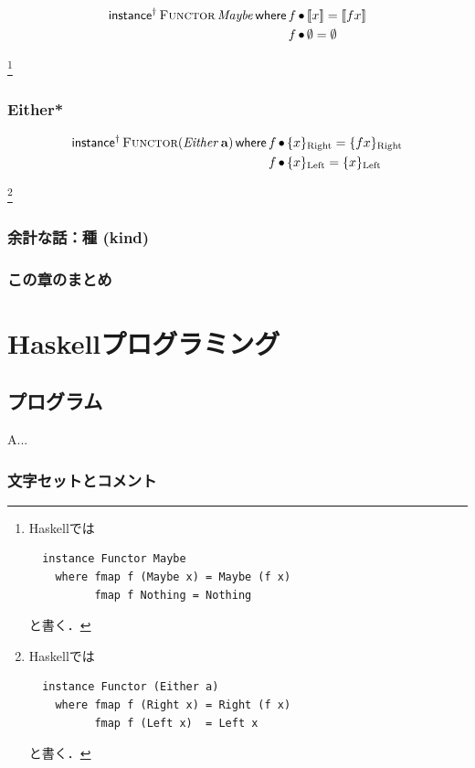 \documentclass[a4paper,twocolumn]{jsbook}
\def\[{\left[\!\left[}
\def\]{\right]\!\right]}
\newcommand{\programminglanguage}[1]{\textsf{#1}}
\newcommand{\haskell}{\programminglanguage{Haskell}}
\newenvironment{leader}{\begingroup\gt}{\endgroup}
\newcommand{\mKeyword}[1]{\mathsf{#1}} %
\newcommand{\mInstanceKeyword}{\mKeyword{instance}}
\newcommand{\mWhereKeyword}{\mKeyword{where}}
\DeclareMathOperator{\mInstanceParametric}{\mInstanceKeyword^{\dagger}}
\DeclareMathOperator{\mWhere}{\mWhereKeyword}
\newcommand{\mNothing}{\emptyset}
\DeclareMathOperator{\mLetEq}{\triangleq}
\DeclareMathOperator{\mMap}{\bullet}
\newcommand{\mSpecialSub}[1]{\text{#1}}
\newcommand{\mLeft}{\mSpecialSub{Left}}
\newcommand{\mRight}{\mSpecialSub{Right}}
\newcommand{\mType}[1]{\mathbf{#1}}
\newcommand{\mEitherLeftWith}[1]{\{#1\}_\mLeft}
\newcommand{\mEitherRightWith}[1]{\{#1\}_\mRight}
\newcommand{\mMaybeWith}[1]{\[#1\]}
\newcommand{\mTypeConstructor}[1]{\mathit{#1}} %
\DeclareMathOperator{\mEitherTypeConstructor}{\mTypeConstructor{Either}}
\DeclareMathOperator{\mMaybeTypeConstructor}{\mTypeConstructor{Maybe}}
\newcommand{\mSpecialTypeClass}[1]{\textsc{#1}} %
\newcommand{\mFunctorTypeClass}{\mSpecialTypeClass{Functor}}
\newcommand{\mWhere}[2]{\mathbin{\mWhereKeyword}#1\mLetEq#2}
\begin{document}
\begin{align*}
\mInstanceParametric\mathop{\mFunctorTypeClass}\mMaybeTypeConstructor\mWhere{}
&f\mMap\mMaybeWith{x}=\mMaybeWith{fx}\\
&f\mMap\mNothing=\mNothing
\end{align*}


{}\footnote{\haskell では
\begin{verbatim}
  instance Functor Maybe
    where fmap f (Maybe x) = Maybe (f x)
          fmap f Nothing = Nothing
\end{verbatim}
と書く．}

\section{Either*}

\begin{align*}
\mInstanceParametric\mathop{\mFunctorTypeClass}(\mEitherTypeConstructor\mType{a})\mWhere{}
&f\mMap{}\mEitherRightWith{x}=\mEitherRightWith{fx}\\
&f\mMap{}\mEitherLeftWith{x}=\mEitherLeftWith{x}
\end{align*}


{}\footnote{\haskell では
\begin{verbatim}
  instance Functor (Either a)
    where fmap f (Right x) = Right (f x)
          fmap f (Left x)  = Left x
\end{verbatim}
と書く．}


\section{余計な話：種 (kind)}

\section{この章のまとめ}

\part{\haskell プログラミング}

\chapter{プログラム}

\begin{leader}
A...
\end{leader}


\section{文字セットとコメント}
\end{document}
